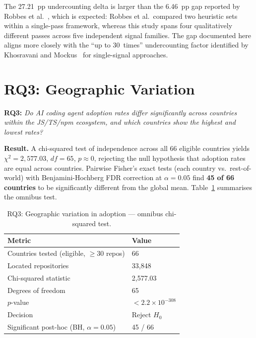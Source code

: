 The 27.21~pp undercounting delta is larger than the 6.46~pp gap reported by Robbes et al.~\cite{robbesAgenticMuch2026}, which is expected: Robbes et al.\ compared two heuristic sets within a single-pass framework, whereas this study spans four qualitatively different passes across five independent signal families. The gap documented here aligns more closely with the ``up to 30~times'' undercounting factor identified by Khosravani and Mockus~\cite{khosravani2026} for single-signal approaches.

\section{RQ3: Geographic Variation}
\label{sec:res:rq3}

\textbf{RQ3:} \textit{Do AI coding agent adoption rates differ significantly across countries within the JS/TS/npm ecosystem, and which countries show the highest and lowest rates?}

\textbf{Result.} A chi-squared test of independence across all 66 eligible countries yields $\chi^2 = 2{,}577.03$, $df = 65$, $p \approx 0$, rejecting the null hypothesis that adoption rates are equal across countries. Pairwise Fisher's exact tests (each country vs.\ rest-of-world) with Benjamini-Hochberg FDR correction at $\alpha = 0.05$ find \textbf{45 of 66 countries} to be significantly different from the global mean. Table~\ref{tab:rq3} summarises the omnibus test.

\begin{table}[h]
\centering
\caption{RQ3: Geographic variation in adoption --- omnibus chi-squared test.}
\label{tab:rq3}
\begin{tabular}{@{}ll@{}}
\toprule
Metric & Value \\
\midrule
Countries tested (eligible, $\geq$30 repos) & 66 \\
Located repositories                        & 33,848 \\
Chi-squared statistic                       & 2,577.03 \\
Degrees of freedom                          & 65 \\
$p$-value                                   & $<2.2 \times 10^{-308}$ \\
Decision                                    & Reject $H_0$ \\
Significant post-hoc (BH, $\alpha=0.05$)   & 45 / 66 \\
\bottomrule
\end{tabular}
\end{table}

